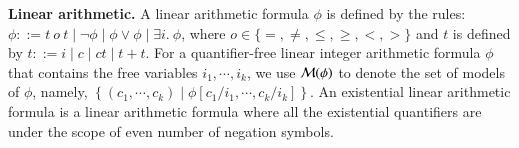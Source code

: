 \noindent\textbf{Linear arithmetic.}  A linear arithmetic formula $\phi$ is defined by the rules: $\phi::= t \ o \ t \mid \neg \phi \mid \phi \vee \phi \mid \exists i.\ \phi$, where $o \in \{=, \neq, \le, \ge, <, >\}$ and $t$ is defined by  $t::= i \mid c \mid ct \mid t + t $.  
For a quantifier-free linear integer arithmetic formula $\phi$ that contains the free variables $i_1, \cdots, i_k$, we use $\mathcal{M}(\phi)$ to denote the set of models of $\phi$, namely, $\left\{(c_1, \cdots ,c_k) \mid \phi[c_1/i_1, \cdots, c_k/i_k]\right\}$. An existential linear arithmetic formula is a linear arithmetic formula where all the existential quantifiers are under the scope of even number of negation symbols.